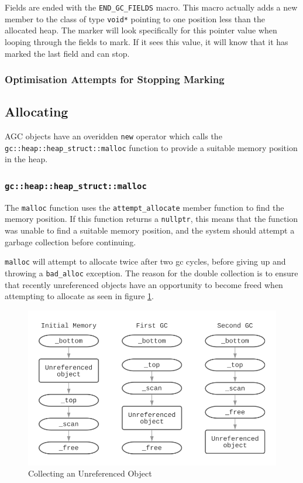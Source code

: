 \documentclass[11pt]{article}
\begin{document}
Fields are ended with the \texttt{END\_GC\_FIELDS} macro. This macro actually adds a new member to the class of
type \texttt{void*} pointing to one position less than the allocated heap. The marker will look specifically 
for this pointer value when looping through the fields to mark. If it sees this value, it will know that it 
has marked the last field and can stop.

\subsubsection{Optimisation Attempts for Stopping Marking}
\subsection{Allocating}
AGC objects have an overidden \texttt{new} operator which calls the 
\texttt{gc::heap::heap\_struct::malloc} function to provide a suitable memory position 
in the heap.

\subsubsection{\texttt{gc::heap::heap\_struct::malloc}}
The \texttt{malloc} function uses the \texttt{attempt\_allocate} member function to find the
memory position. If this function returns a \texttt{nullptr}, this means that the function 
was unable to find a suitable memory position, and the system should attempt a garbage
collection before continuing.

\texttt{malloc} will attempt to allocate twice after two gc cycles, before giving up
and throwing a \texttt{bad\_alloc} exception. The reason for the double collection is 
to ensure that recently unreferenced objects have an opportunity to become freed when 
attempting to allocate as seen in figure \ref{fig:gcingobject}.
\begin{figure}
\begin{center}
\includegraphics[scale=0.5]{./report_srcs/collecting_unreferenced_object.png}
\end{center}
\caption{Collecting an Unreferenced Object}
\label{fig:gcingobject}
\end{figure}
\end{document}
